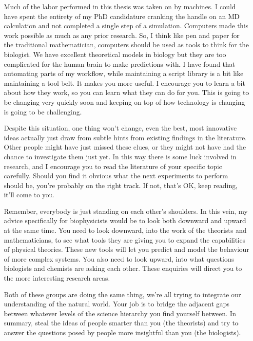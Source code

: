 Much of the labor performed in this thesis was taken on by machines. I could have spent the entirety of my PhD candidature cranking the handle on an MD calculation and not completed a single step of a simulation. Computers made this work possible as much as any prior research. So, I think like pen and paper for the traditional mathematician, computers should be used as tools to think for the biologist. We have excellent theoretical models in biology but they are too complicated for the human brain to make predictions with. I have found that automating parts of my workflow, while maintaining a script library is a bit like maintaining a tool belt. It makes you more useful. I encourage you to learn a bit about how they work, so you can learn what they can do for you. This is going to be changing very quickly soon and keeping on top of how technology is changing is going to be challenging. 

Despite this situation, one thing won't change, even the best, most innovative ideas actually just draw from subtle hints from existing findings in the literature. Other people might have just missed these clues, or they might not have had the chance to investigate them just yet. In this way there is some luck involved in research, and I encourage you to read the literature of your specific topic carefully. Should you find it obvious what the next experiments to perform should be, you're probably on the right track. If not, that's OK, keep reading, it'll come to you.

Remember, everybody is just standing on each other's shoulders. In this vein, my advice specifically for biophysicists would be to look both downward and upward at the same time. You need to look downward, into the work of the theorists and mathematicians, to see what tools they are giving you to expand the capabilities of physical theories. These new tools will let you predict and model the behaviour of more complex systems. You also need to look upward, into what questions biologists and chemists are asking each other. These enquiries will direct you to the more interesting research areas. 

Both of these groups are doing the same thing, we're all trying to integrate our understanding of the natural world. Your job is to bridge the adjacent gaps between whatever levels of the science hierarchy you find yourself between. In summary, steal the ideas of people smarter than you (the theorists) and try to answer the questions posed by people more insightful than you (the biologists). 


